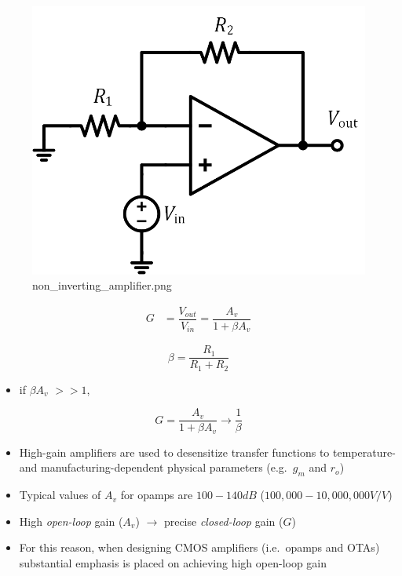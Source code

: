 \documentclass[11pt]{article}
\providecommand{\tightlist}{%
      \setlength{\itemsep}{0pt}\setlength{\parskip}{0pt}}
\begin{document}
    \begin{figure}
\centering
\includegraphics{non_inverting_amplifier.png}
\caption{non\_inverting\_amplifier.png}
\end{figure}

    \begin{align}
G &= \dfrac{V_{out}}{V_{in}} = \dfrac{A_v}{1+\beta A_v}
\end{align}

\begin{equation}
\beta = \dfrac{R_1}{R_1+R_2}
\end{equation}

\begin{itemize}
\tightlist
\item
  if \(\beta A_v\) \(>> 1\),
\end{itemize}

\begin{equation}
G = \dfrac{A_v}{1+\beta A_v} \rightarrow \dfrac{1}{\beta}
\end{equation}

    \begin{itemize}
\tightlist
\item
  High-gain amplifiers are used to desensitize transfer functions to
  temperature- and manufacturing-dependent physical parameters
  (e.g.~\(g_m\) and \(r_o\))
\item
  Typical values of \(A_v\) for opamps are \(100 - 140 dB\)
  (\(100,000 - 10,000,000 V/V\))
\item
  High \emph{open-loop} gain (\(A_v\)) \(\rightarrow\) precise
  \emph{closed-loop} gain (\(G\))
\item
  For this reason, when designing CMOS amplifiers (i.e.~opamps and OTAs)
  substantial emphasis is placed on achieving high open-loop gain
\end{itemize}
\end{document}
